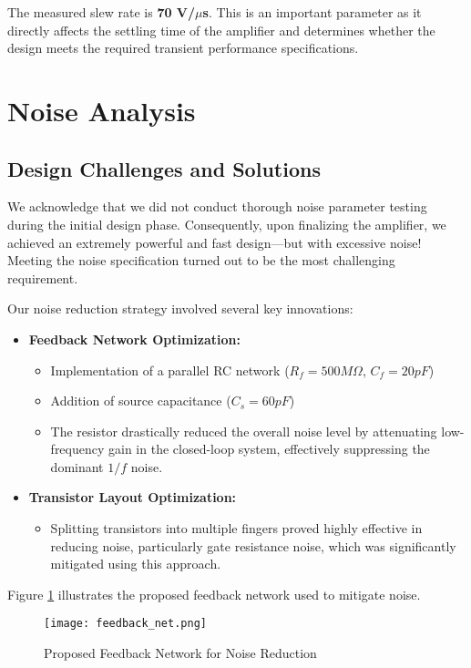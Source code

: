 \documentclass[a4paper,12pt]{article}
\begin{document}
The measured slew rate is \textbf{70 V/$\mu$s}. This is an important parameter as it directly affects the settling time of the amplifier and determines whether the design meets the required transient performance specifications.
\newpage
\section{Noise Analysis}

\subsection{Design Challenges and Solutions}

We acknowledge that we did not conduct thorough noise parameter testing during the initial design phase. Consequently, upon finalizing the amplifier, we achieved an extremely powerful and fast design—but with excessive noise! Meeting the noise specification turned out to be the most challenging requirement.



Our noise reduction strategy involved several key innovations:

\begin{itemize}
\item \textbf{Feedback Network Optimization:}
\begin{itemize}
\item Implementation of a parallel RC network ($R_f = 500M\Omega$, $C_f = 20pF$)
\item Addition of source capacitance ($C_s = 60pF$)
\item The resistor drastically reduced the overall noise level by attenuating low-frequency gain in the closed-loop system, effectively suppressing the dominant $1/f$ noise.
\end{itemize}
\item \textbf{Transistor Layout Optimization:}
\begin{itemize}
\item Splitting transistors into multiple fingers proved highly effective in reducing noise, particularly gate resistance noise, which was significantly mitigated using this approach.
\end{itemize}
\end{itemize}

Figure \ref{fig:feedback_net} illustrates the proposed feedback network used to mitigate noise.

\begin{figure}[H]
\centering
\texttt{[image: feedback\_net.png]}
\caption{Proposed Feedback Network for Noise Reduction}
\label{fig:feedback_net}
\end{figure}
\end{document}
